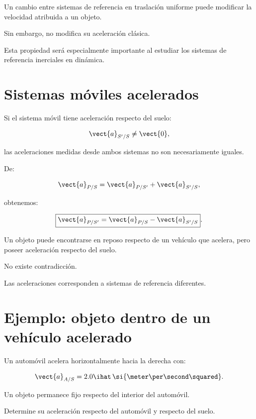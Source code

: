 \begin{interpretacion}

Un cambio entre sistemas de referencia en traslación
uniforme puede modificar la velocidad atribuida
a un objeto.

Sin embargo, no modifica su aceleración clásica.

Esta propiedad será especialmente importante al
estudiar los sistemas de referencia inerciales
en dinámica.

\end{interpretacion}


\section{Sistemas móviles acelerados}

Si el sistema móvil tiene aceleración respecto del suelo:

\[
\vect{a}_{S'/S}\neq\vect{0},
\]

las aceleraciones medidas desde ambos sistemas
no son necesariamente iguales.

De:

\[
\vect{a}_{P/S}
=
\vect{a}_{P/S'}
+
\vect{a}_{S'/S},
\]

obtenemos:

\[
\boxed{
\vect{a}_{P/S'}
=
\vect{a}_{P/S}
-
\vect{a}_{S'/S}
}.
\]

\begin{interpretacion}

Un objeto puede encontrarse en reposo respecto de
un vehículo que acelera, pero poseer aceleración
respecto del suelo.

No existe contradicción.

Las aceleraciones corresponden a sistemas de referencia
diferentes.

\end{interpretacion}


\section{Ejemplo: objeto dentro de un vehículo acelerado}

\begin{ejemplo}

Un automóvil acelera horizontalmente hacia la derecha con:

\[
\vect{a}_{A/S}
=
2.0\ihat\,
\si{\meter\per\second\squared}.
\]

Un objeto permanece fijo respecto del interior
del automóvil.

Determine su aceleración respecto del automóvil
y respecto del suelo.

\end{ejemplo}

